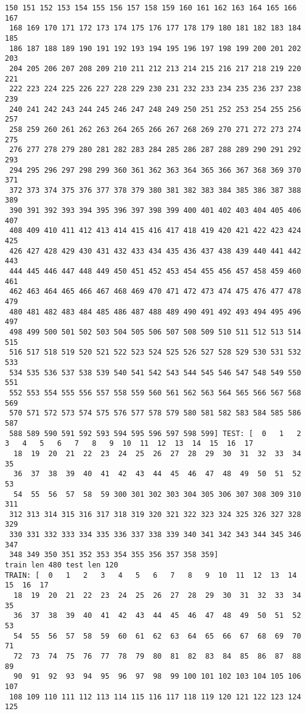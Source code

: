 \documentclass[11pt]{article}
\begin{document}
\begin{Verbatim}[commandchars=\\\{\}]
 150 151 152 153 154 155 156 157 158 159 160 161 162 163 164 165 166 167
 168 169 170 171 172 173 174 175 176 177 178 179 180 181 182 183 184 185
 186 187 188 189 190 191 192 193 194 195 196 197 198 199 200 201 202 203
 204 205 206 207 208 209 210 211 212 213 214 215 216 217 218 219 220 221
 222 223 224 225 226 227 228 229 230 231 232 233 234 235 236 237 238 239
 240 241 242 243 244 245 246 247 248 249 250 251 252 253 254 255 256 257
 258 259 260 261 262 263 264 265 266 267 268 269 270 271 272 273 274 275
 276 277 278 279 280 281 282 283 284 285 286 287 288 289 290 291 292 293
 294 295 296 297 298 299 360 361 362 363 364 365 366 367 368 369 370 371
 372 373 374 375 376 377 378 379 380 381 382 383 384 385 386 387 388 389
 390 391 392 393 394 395 396 397 398 399 400 401 402 403 404 405 406 407
 408 409 410 411 412 413 414 415 416 417 418 419 420 421 422 423 424 425
 426 427 428 429 430 431 432 433 434 435 436 437 438 439 440 441 442 443
 444 445 446 447 448 449 450 451 452 453 454 455 456 457 458 459 460 461
 462 463 464 465 466 467 468 469 470 471 472 473 474 475 476 477 478 479
 480 481 482 483 484 485 486 487 488 489 490 491 492 493 494 495 496 497
 498 499 500 501 502 503 504 505 506 507 508 509 510 511 512 513 514 515
 516 517 518 519 520 521 522 523 524 525 526 527 528 529 530 531 532 533
 534 535 536 537 538 539 540 541 542 543 544 545 546 547 548 549 550 551
 552 553 554 555 556 557 558 559 560 561 562 563 564 565 566 567 568 569
 570 571 572 573 574 575 576 577 578 579 580 581 582 583 584 585 586 587
 588 589 590 591 592 593 594 595 596 597 598 599] TEST: [  0   1   2   3   4   5   6   7   8   9  10  11  12  13  14  15  16  17
  18  19  20  21  22  23  24  25  26  27  28  29  30  31  32  33  34  35
  36  37  38  39  40  41  42  43  44  45  46  47  48  49  50  51  52  53
  54  55  56  57  58  59 300 301 302 303 304 305 306 307 308 309 310 311
 312 313 314 315 316 317 318 319 320 321 322 323 324 325 326 327 328 329
 330 331 332 333 334 335 336 337 338 339 340 341 342 343 344 345 346 347
 348 349 350 351 352 353 354 355 356 357 358 359]
train len 480 test len 120
TRAIN: [  0   1   2   3   4   5   6   7   8   9  10  11  12  13  14  15  16  17
  18  19  20  21  22  23  24  25  26  27  28  29  30  31  32  33  34  35
  36  37  38  39  40  41  42  43  44  45  46  47  48  49  50  51  52  53
  54  55  56  57  58  59  60  61  62  63  64  65  66  67  68  69  70  71
  72  73  74  75  76  77  78  79  80  81  82  83  84  85  86  87  88  89
  90  91  92  93  94  95  96  97  98  99 100 101 102 103 104 105 106 107
 108 109 110 111 112 113 114 115 116 117 118 119 120 121 122 123 124 125

\end{Verbatim}
\end{document}
